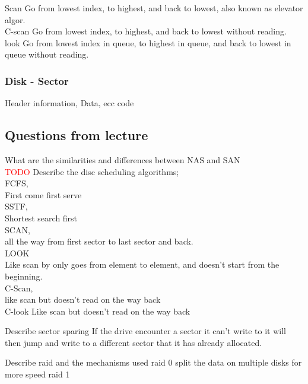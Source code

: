 \documentclass[a4paper,10pt,titlepage]{report}
\begin{document}
Scan
Go from lowest index, to highest, and back to lowest, also known as elevator algor.\\



C-scan
Go from lowest index, to highest, and back to lowest without reading.\\



look
Go from lowest index in queue, to highest in queue, and back to lowest in queue without reading.\\
\subsubsection{Disk - Sector}
Header information, Data, ecc code \\






\subsection{Questions from lecture}
	What are the similarities and differences between NAS and SAN \\
		\textcolor{red}{TODO}
	Describe the disc scheduling algorithms; \\
		FCFS, \\
		First come first serve\\
		
		SSTF, \\
		Shortest search first \\
			
		SCAN, \\
		all the way from first sector to last sector and back.\\
		
		LOOK \\
		Like scan by only goes from element to element, and doesn't start from the beginning. \\	
	
		C-Scan, \\
		like scan but doesn't read on the way back \\
		
		
		C-look		
		Like scan  but doesn't read on the way back
		
	Describe sector sparing
		If the drive encounter a sector it can't write to it will then jump and write to a different sector that it has already allocated.
	
	Describe raid and the mechanisms used
	raid 0
		split the data on multiple disks for more speed
	raid 1
	
\end{document}

